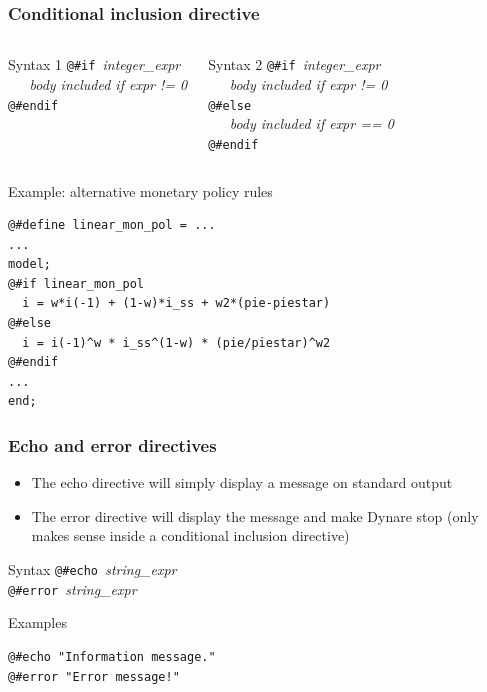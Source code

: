 \documentclass{beamer}
\begin{document}
\begin{frame}[fragile=singleslide]
  \frametitle{Conditional inclusion directive}

  \begin{columns}[T]
    \begin{block}{Syntax 1}
\verb+@#if +\textit{integer\_expr} \\
\verb+   +\textit{body included if expr != 0} \\
\verb+@#endif+
    \end{block}

    \begin{block}{Syntax 2}
\verb+@#if +\textit{integer\_expr} \\
\verb+   +\textit{body included if expr != 0} \\
\verb+@#else+ \\
\verb+   +\textit{body included if expr == 0} \\
\verb+@#endif+
    \end{block}
  \end{columns}

  \begin{block}{Example: alternative monetary policy rules}
    \scriptsize
\begin{verbatim}
@#define linear_mon_pol = ...
...
model;
@#if linear_mon_pol
  i = w*i(-1) + (1-w)*i_ss + w2*(pie-piestar)
@#else
  i = i(-1)^w * i_ss^(1-w) * (pie/piestar)^w2
@#endif
...
end;
\end{verbatim}
    \scriptsize
  \end{block}
\end{frame}

\begin{frame}[fragile=singleslide]
  \frametitle{Echo and error directives}

  \begin{itemize}
  \item The echo directive will simply display a message on standard output
  \item The error directive will display the message and make Dynare stop (only makes sense inside a conditional inclusion directive)
  \end{itemize}

  \begin{block}{Syntax}
\verb+@#echo +\textit{string\_expr} \\
\verb+@#error +\textit{string\_expr}
  \end{block}

  \begin{block}{Examples}
\begin{verbatim}
@#echo "Information message."
@#error "Error message!"
\end{verbatim}
  \end{block}
\end{frame}
\end{document}
